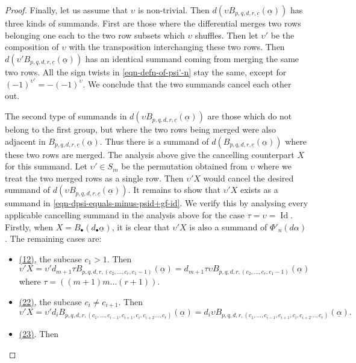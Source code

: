 \documentclass[12pt,a4paper,reqno]{amsart}
\DeclareMathOperator{\id}{Id}
\begin{document}
\begin{proof}
Finally, let us assume that $\upsilon$ is non-trivial. 
Then 
$d \left(\upsilon B_{p,q,d,r,\underline{c}}(\underline{\alpha})\right)$ 
has three kinds of summands. First are those where the differential 
merges two rows belonging one each to the two row subsets which
$\upsilon$ shuffles. Then let $\upsilon'$ be the composition of
$\upsilon$ with the transposition interchanging these two rows. Then 
$d \left(\upsilon' B_{p,q,d,r,\underline{c}}(\underline{\alpha})\right)$ 
has an identical summand coming from merging the same two rows. All 
the sign twists in \eqref{eqn-defn-of-psi'-n} stay the same, 
except for $(-1)^{\upsilon'} = - (-1)^{\upsilon}$. We conclude that
the two summands cancel each other out. 

The second type of summands in 
$d \left(\upsilon B_{p,q,d,r,\underline{c}}(\underline{\alpha})\right)$
are those which do not belong to the first group, but
where the two rows being merged were also adjacent in 
$B_{p,q,d,r,\underline{c}}(\underline{\alpha})$. 
Thus there is a summand of 
$d(B_{p,q,d,r,\underline{c}}(\underline{\alpha}))$ 
where these two rows are merged.  
The analysis above give the cancelling counterpart $X$ for this summand. 
Let $\upsilon' \in S_m$ be the permutation obtained from $\upsilon$
where we treat the two merged rows as a single row. 
Then $\upsilon' X$ would cancel the desired summand of 
$d \left(\upsilon B_{p,q,d,r,\underline{c}}(\underline{\alpha})\right)$. 
It remains to show that $\upsilon'X$ exists as a summand in  
\eqref{eqn-dpsi-equals-minus-psid+gf-id}. We verify this
by analysing every applicable cancelling summand in the analysis
above for the case $\tau = \upsilon = \id$. Firstly, when 
$X = B_\bullet(d_\bullet \underline{\alpha})$, it is clear 
that $\upsilon' X$ is also a summand of $\Phi'_n(d \alpha)$. 
The remaining cases are:
\begin{itemize}
\item \underline{(12)}, the subcase $c_1 > 1$. Then 
$$ \upsilon' X = \upsilon' 
d_{m+1} \tau B_{p, q, d, r, (c_2, \dots, c_r, c_1 - 1)}(\underline{\alpha})
= 
d_{m+1} \tau \upsilon 
B_{p, q, d, r, (c_2, \dots, c_r, c_1 - 1)}(\underline{\alpha})
$$
where $\tau = \left((m+1)m\dots(r+1)\right)$.
\item \underline{(22)}, the subcase $c_i \neq c_{i+1}$. Then 
$$
\upsilon' X = \upsilon' 
d_{i} B_{p, q, d, r,(c_1, \dots, c_{i-1},
c_{i+1}, c_{i}, c_{i+2} \dots, c_r)} (\underline{\alpha})
= 
d_{i} \upsilon B_{p, q, d, r,(c_1, \dots, c_{i-1},
c_{i+1}, c_{i}, c_{i+2} \dots, c_r)} (\underline{\alpha}).$$ 
\item \underline{(23)}. Then 

\end{itemize}
\end{proof}
\end{document}
